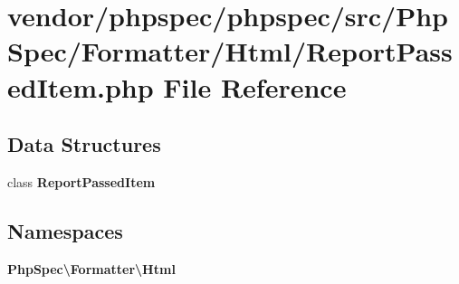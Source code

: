 \section{vendor/phpspec/phpspec/src/\+Php\+Spec/\+Formatter/\+Html/\+Report\+Passed\+Item.php File Reference}
\label{_report_passed_item_8php}
\subsection*{Data Structures}
\begin{DoxyCompactItemize}
\item 
class {\bf Report\+Passed\+Item}
\end{DoxyCompactItemize}
\subsection*{Namespaces}
\begin{DoxyCompactItemize}
\item 
 {\bf Php\+Spec\textbackslash{}\+Formatter\textbackslash{}\+Html}
\end{DoxyCompactItemize}
